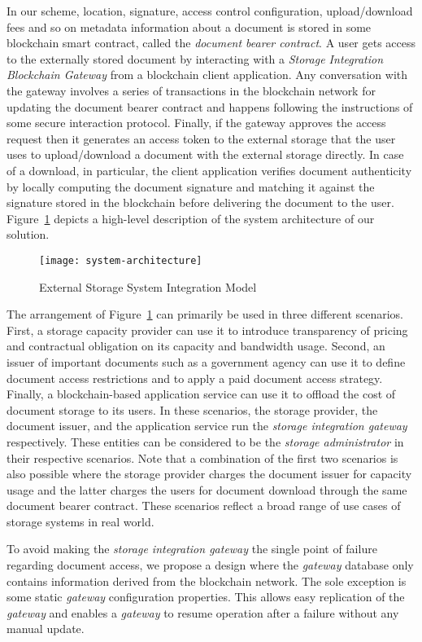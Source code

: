In our scheme, location, signature, access control configuration, upload/download fees and so on metadata information about a document is stored in some blockchain smart contract, called the {\it document bearer contract}. A user gets access to the externally stored document by interacting with a \textit{Storage Integration Blockchain Gateway} from a blockchain client application. Any conversation with the gateway involves a series of transactions in the blockchain network for updating the document bearer contract and happens following the instructions of some secure interaction protocol. Finally, if the gateway approves the access request then it generates an access token to the external storage that the user uses to upload/download a document with the external storage directly. In case of a download, in particular, the client application verifies document authenticity by locally computing the document signature and matching it against the signature stored in the blockchain before delivering the document to the user. 
Figure~\ref{fig-1} depicts a high-level description of the system architecture of our solution.   
\begin{figure}[h]
\centering
\texttt{[image: system-architecture]}                    
\caption{External Storage System Integration Model}\label{fig-1}
\end{figure}

The arrangement of Figure~\ref{fig-1} can primarily be used in three different scenarios. First, a storage capacity provider can use it to introduce transparency of pricing and contractual obligation on its capacity and bandwidth usage. Second, an issuer of important documents such as a government agency can use it to define document access restrictions and to apply a paid document access strategy. Finally, a blockchain-based application service can use it to offload the cost of document storage to its users. In these scenarios, the storage provider, the document issuer, and the application service run the \textit{storage integration gateway} respectively. These entities can be considered to be the \textit{storage administrator} in their respective scenarios. Note that a combination of the first two scenarios is also possible where the storage provider charges the document issuer for capacity usage and the latter charges the users for document download through the same document bearer contract. These scenarios reflect a broad range of use cases of storage systems in real world.          

To avoid making the \textit{storage integration gateway} the single point of failure regarding document access, we propose a design where the \textit{gateway} database only contains information derived from the blockchain network. The sole exception is some static \textit{gateway} configuration properties. This allows easy replication of the \textit{gateway} and enables a \textit{gateway} to resume operation after a failure without any manual update. 

